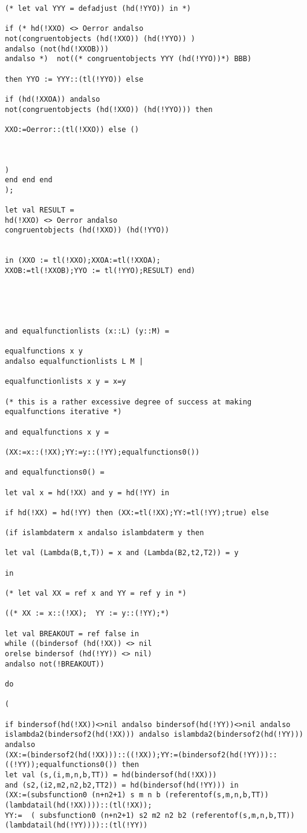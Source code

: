 \documentclass[12pt]{article}
\begin{document}
\begin{verbatim}
(* let val YYY = defadjust (hd(!YYO)) in *)

if (* hd(!XXO) <> Oerror andalso 
not(congruentobjects (hd(!XXO)) (hd(!YYO)) )
andalso (not(hd(!XXOB)))
andalso *)  not((* congruentobjects YYY (hd(!YYO))*) BBB)

then YYO := YYY::(tl(!YYO)) else 

if (hd(!XXOA)) andalso 
not(congruentobjects (hd(!XXO)) (hd(!YYO))) then

XXO:=Oerror::(tl(!XXO)) else ()

 

)
end end end
);
 
let val RESULT = 
hd(!XXO) <> Oerror andalso
congruentobjects (hd(!XXO)) (hd(!YYO)) 


in (XXO := tl(!XXO);XXOA:=tl(!XXOA);
XXOB:=tl(!XXOB);YYO := tl(!YYO);RESULT) end)
 




and equalfunctionlists (x::L) (y::M) =

equalfunctions x y
andalso equalfunctionlists L M |

equalfunctionlists x y = x=y

(* this is a rather excessive degree of success at making
equalfunctions iterative *)

and equalfunctions x y =

(XX:=x::(!XX);YY:=y::(!YY);equalfunctions0())

and equalfunctions0() =

let val x = hd(!XX) and y = hd(!YY) in

if hd(!XX) = hd(!YY) then (XX:=tl(!XX);YY:=tl(!YY);true) else

(if islambdaterm x andalso islambdaterm y then

let val (Lambda(B,t,T)) = x and (Lambda(B2,t2,T2)) = y

in

(* let val XX = ref x and YY = ref y in *)

((* XX := x::(!XX);  YY := y::(!YY);*)

let val BREAKOUT = ref false in
while ((bindersof (hd(!XX)) <> nil 
orelse bindersof (hd(!YY)) <> nil) 
andalso not(!BREAKOUT))

do

(

if bindersof(hd(!XX))<>nil andalso bindersof(hd(!YY))<>nil andalso
islambda2(bindersof2(hd(!XX))) andalso islambda2(bindersof2(hd(!YY))) andalso
(XX:=(bindersof2(hd(!XX)))::((!XX));YY:=(bindersof2(hd(!YY)))::((!YY));equalfunctions0()) then
let val (s,(i,m,n,b,TT)) = hd(bindersof(hd(!XX)))
and (s2,(i2,m2,n2,b2,TT2)) = hd(bindersof(hd(!YY))) in 
(XX:=(subsfunction0 (n+n2+1) s m n b (referentof(s,m,n,b,TT))(lambdatail(hd(!XX))))::(tl(!XX));
YY:=  ( subsfunction0 (n+n2+1) s2 m2 n2 b2 (referentof(s,m,n,b,TT))   (lambdatail(hd(!YY))))::(tl(!YY)) 


\end{verbatim}
\end{document}
